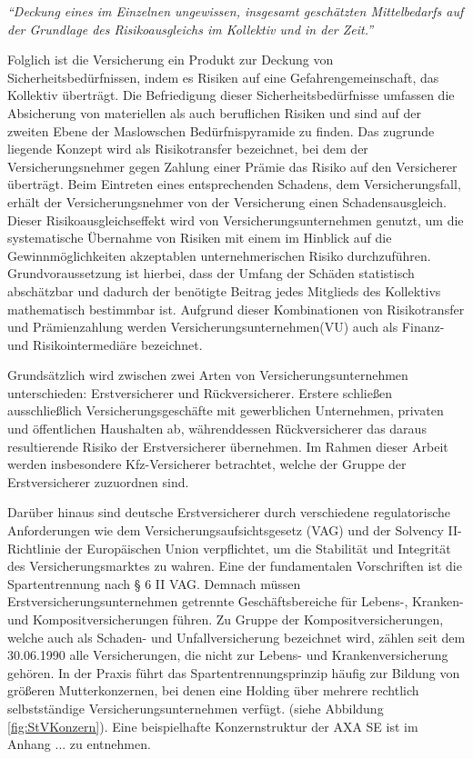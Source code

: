 \begin{center}
    \textit{\enquote{Deckung eines im Einzelnen ungewissen, insgesamt geschätzten Mittelbedarfs auf der Grundlage des Risikoausgleichs im Kollektiv und in der Zeit.}} \autocite[S. 8f.]{FARNY2011}
\end{center}

Folglich ist die Versicherung ein Produkt zur Deckung von Sicherheitsbedürfnissen, indem es Risiken auf eine Gefahrengemeinschaft, das Kollektiv überträgt. Die Befriedigung dieser Sicherheitsbedürfnisse umfassen die Absicherung von materiellen als auch beruflichen Risiken und sind auf der zweiten Ebene der Maslowschen Bedürfnispyramide zu finden. \autocite[Vgl.][S. 30]{BECKER2019} Das zugrunde liegende Konzept wird als Risikotransfer bezeichnet, bei dem der Versicherungsnehmer gegen Zahlung einer Prämie das Risiko auf den Versicherer überträgt. Beim Eintreten eines entsprechenden Schadens, dem Versicherungsfall, erhält der Versicherungsnehmer von der Versicherung einen Schadensausgleich. Dieser Risikoausgleichseffekt wird von Versicherungsunternehmen genutzt, um die systematische Übernahme von Risiken mit einem im Hinblick auf die Gewinnmöglichkeiten akzeptablen unternehmerischen Risiko durchzuführen. \autocite[Vgl.][S. 9]{FARNY2011}
Grundvoraussetzung ist hierbei, dass der Umfang der Schäden statistisch abschätzbar und dadurch der benötigte Beitrag jedes Mitglieds des Kollektivs mathematisch bestimmbar ist. Aufgrund dieser Kombinationen von Risikotransfer und Prämienzahlung werden Versicherungsunternehmen(VU) auch als Finanz- und Risikointermediäre bezeichnet. \autocite[Vgl.][S. 53]{ZWACK2017}

Grundsätzlich wird zwischen zwei Arten von Versicherungsunternehmen unterschieden: Erstversicherer und Rückversicherer. Erstere schließen ausschließlich Versicherungsgeschäfte mit gewerblichen Unternehmen, privaten und öffentlichen Haushalten ab, währenddessen Rückversicherer das daraus resultierende Risiko der Erstversicherer übernehmen.\autocite[Vgl.][S. 240f.]{FARNY2011} Im Rahmen dieser Arbeit werden insbesondere Kfz-Versicherer betrachtet, welche der Gruppe der Erstversicherer zuzuordnen sind.

Darüber hinaus sind deutsche Erstversicherer durch verschiedene regulatorische Anforderungen wie dem Versicherungsaufsichtsgesetz (VAG) und der Solvency II-Richtlinie der Europäischen Union verpflichtet, um die Stabilität und Integrität des Versicherungsmarktes zu wahren. \autocite[Vgl.][]{BAFIN2016} Eine der fundamentalen Vorschriften ist die Spartentrennung nach § 6 II VAG. Demnach müssen Erstversicherungsunternehmen getrennte Geschäftsbereiche für Lebens-, Kranken- und Kompositversicherungen führen. Zu Gruppe der Kompositversicherungen, welche auch als Schaden- und Unfallversicherung bezeichnet wird, zählen seit dem 30.06.1990 alle Versicherungen, die nicht zur Lebens- und Krankenversicherung gehören. \autocite[Vgl.][S. 241-243]{FARNY2011} In der Praxis führt das Spartentrennungsprinzip häufig zur Bildung von größeren Mutterkonzernen, bei denen eine Holding über mehrere rechtlich selbstständige Versicherungsunternehmen verfügt. (siehe Abbildung \vref{fig:StVKonzern}). Eine beispielhafte Konzernstruktur der AXA SE ist im Anhang ... zu entnehmen. 


